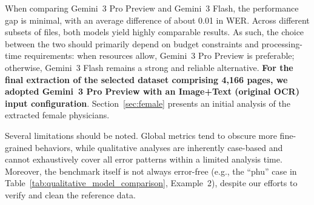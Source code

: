 When comparing Gemini~3 Pro Preview and Gemini~3 Flash, the performance gap is minimal, with an average difference of about 0.01 in WER. Across different subsets of files, both models yield highly comparable results. As such, the choice between the two should primarily depend on budget constraints and processing-time requirements: when resources allow, Gemini~3 Pro Preview is preferable; otherwise, Gemini~3 Flash remains a strong and reliable alternative. \textbf{For the final extraction of the selected dataset comprising 4,166 pages, we adopted Gemini~3 Pro Preview with an Image+Text (original OCR) input configuration}. Section~\ref{sec:female} presents an initial analysis of the extracted female physicians.

Several limitations should be noted. Global metrics tend to obscure more fine-grained behaviors, while qualitative analyses are inherently case-based and cannot exhaustively cover all error patterns within a limited analysis time. Moreover, the benchmark itself is not always error-free (e.g., the ``phu'' case in Table~\ref{tab:qualitative_model_comparison}, Example~2), despite our efforts to verify and clean the reference data.